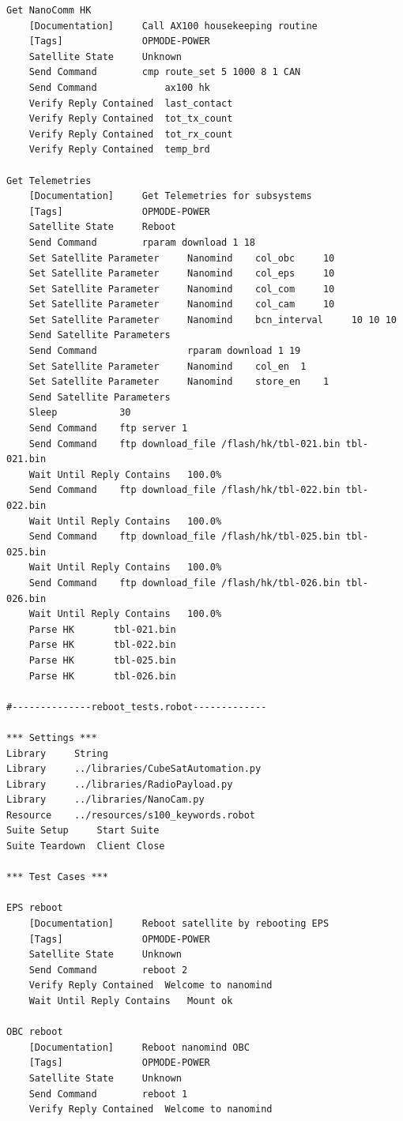 \documentclass[english,12pt,a4paper,pdftex,elec,utf8]{aaltothesis}
\begin{document}
\begin{verbatim}
Get NanoComm HK
	[Documentation]		Call AX100 housekeeping routine
	[Tags]				OPMODE-POWER
	Satellite State 	Unknown
	Send Command 		cmp route_set 5 1000 8 1 CAN
	Send Command 			ax100 hk
	Verify Reply Contained 	last_contact
	Verify Reply Contained 	tot_tx_count
	Verify Reply Contained 	tot_rx_count
	Verify Reply Contained 	temp_brd

Get Telemetries
	[Documentation]		Get Telemetries for subsystems
	[Tags]				OPMODE-POWER
    Satellite State     Reboot
    Send Command        rparam download 1 18
    Set Satellite Parameter     Nanomind    col_obc     10
    Set Satellite Parameter     Nanomind    col_eps     10
    Set Satellite Parameter     Nanomind    col_com     10
    Set Satellite Parameter     Nanomind    col_cam     10
    Set Satellite Parameter     Nanomind    bcn_interval     10 10 10
    Send Satellite Parameters
    Send Command                rparam download 1 19
    Set Satellite Parameter     Nanomind    col_en  1
    Set Satellite Parameter     Nanomind    store_en    1
    Send Satellite Parameters
    Sleep           30
	Send Command 	ftp server 1
	Send Command 	ftp download_file /flash/hk/tbl-021.bin tbl-021.bin
    Wait Until Reply Contains   100.0%
    Send Command    ftp download_file /flash/hk/tbl-022.bin tbl-022.bin
    Wait Until Reply Contains   100.0%
    Send Command    ftp download_file /flash/hk/tbl-025.bin tbl-025.bin
    Wait Until Reply Contains   100.0%
    Send Command    ftp download_file /flash/hk/tbl-026.bin tbl-026.bin
    Wait Until Reply Contains   100.0%
	Parse HK       tbl-021.bin
    Parse HK       tbl-022.bin
    Parse HK       tbl-025.bin
    Parse HK       tbl-026.bin
    
#--------------reboot_tests.robot-------------
    
*** Settings ***
Library		String
Library		../libraries/CubeSatAutomation.py
Library		../libraries/RadioPayload.py
Library		../libraries/NanoCam.py
Resource	../resources/s100_keywords.robot
Suite Setup		Start Suite
Suite Teardown	Client Close

*** Test Cases ***

EPS reboot
	[Documentation]		Reboot satellite by rebooting EPS
	[Tags]				OPMODE-POWER
	Satellite State 	Unknown
	Send Command		reboot 2
	Verify Reply Contained 	Welcome to nanomind
    Wait Until Reply Contains   Mount ok
    
OBC reboot
	[Documentation]		Reboot nanomind OBC
	[Tags]				OPMODE-POWER
	Satellite State 	Unknown
	Send Command		reboot 1
	Verify Reply Contained 	Welcome to nanomind


\end{verbatim}
\end{document}
